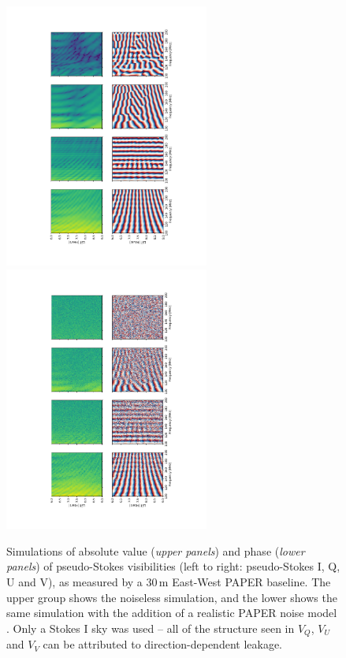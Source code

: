 \begin{figure}
\centering
\includegraphics[width=0.6\textwidth, angle=270]{chapters/polcal/figures/sim_nonoise.pdf}
\includegraphics[width=0.6\textwidth, angle=270]{chapters/polcal/figures/sim.pdf}
\caption[Simulations of pseudo-Stokes visibilities,]{Simulations of absolute value (\textit{upper panels}) and phase (\textit{lower panels}) of pseudo-Stokes visibilities (left to right: pseudo-Stokes I, Q, U and V), as measured by a 30\,m East-West PAPER baseline. The upper group shows the noiseless simulation, and the lower shows the same simulation with the addition of a realistic PAPER noise model \citep{Moore.17}. Only a Stokes I sky was used -- all of the structure seen in $V_Q$, $V_U$ and $V_V$ can be attributed to direction-dependent leakage.}
\label{fig:simvis}
\end{figure}


